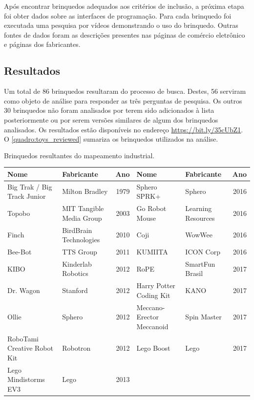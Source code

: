 {Após encontrar brinquedos adequados aos critérios de inclusão, a próxima etapa foi obter dados sobre as interfaces de programação. Para cada brinquedo foi executada uma pesquisa por vídeos demonstrando o uso do brinquedo. Outras fontes de dados foram as descrições presentes nas páginas de comércio eletrônico e páginas dos fabricantes. 

\subsection{Resultados}
Um total de 86 brinquedos resultaram do processo de busca. Destes, 56 serviram como objeto de análise para responder as três perguntas de pesquisa. Os outros 30 brinquedos não foram analisados por terem sido adicionados à lista posteriormente ou por serem versões similares de algum dos brinquedos analisados. Os resultados estão disponíveis no endereço \url{https://bit.ly/35cUbZ1}. O \autoref{quadro:toys_reviewed} sumariza os brinquedos utilizados na análise.
\begin{landscape}
\linespread{1}
\begin{quadro}
 \caption{Brinquedos resultantes do mapeamento industrial.}
 \label{quadro:toys_reviewed}
\end{quadro}
\begin{small}
\begin{longtable}{|p{4.5cm} p{4.5cm} r| p{4.5cm} p{4.5cm} r|}
    \hline
    Nome & Fabricante & Ano & Nome & Fabricante & Ano \\ \hline
    Big Trak / Big Track Junior & Milton Bradley & 1979 &
    Sphero SPRK+ & Sphero & 2016 \\ \hline
    Topobo & MIT Tangible Media Group & 2003 &
    Go Robot Mouse & Learning Resources & 2016 \\ \hline
    Finch & BirdBrain Technologies & 2010 &
    Coji & WowWee & 2016 \\ \hline
    Bee-Bot & TTS Group & 2011 &
    KUMIITA & ICON Corp & 2016 \\ \hline
    KIBO & Kinderlab Robotics & 2012 &
    RoPE & SmartFun Brasil & 2017 \\ \hline
    Dr. Wagon & Stanford & 2012 &
    Harry Potter Coding Kit & KANO & 2017 \\ \hline
    Ollie & Sphero & 2012 &
    Meccano-Erector Meccanoid & Spin Master & 2017 \\ \hline
    RoboTami Creative Robot Kit & Robotron & 2012 &
    Lego Boost & Lego & 2017 \\ \hline
    Lego Mindistorms EV3 & Lego & 2013 &

\end{longtable}
\end{small}
\end{landscape}}
